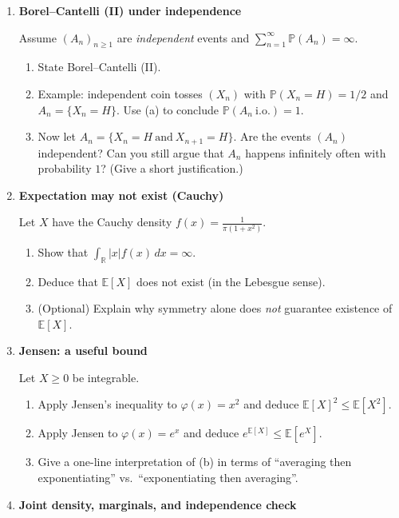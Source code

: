 \documentclass[11pt]{article}
\begin{document}
\begin{enumerate}[leftmargin=*, itemsep=1.2em]
\item \textbf{Borel--Cantelli (II) under independence}

Assume $(A_n)_{n\ge1}$ are \emph{independent} events and $\sum_{n=1}^\infty \mathbb{P}(A_n)=\infty$.
\begin{enumerate}[label=(\alph*)]
\item State Borel--Cantelli (II).
\item Example: independent coin tosses $(X_n)$ with $\mathbb{P}(X_n=H)=1/2$ and $A_n=\{X_n=H\}$.
Use (a) to conclude $\mathbb{P}(A_n\ \text{i.o.})=1$.
\item Now let $A_n=\{X_n=H \ \text{and}\ X_{n+1}=H\}$. Are the events $(A_n)$ independent?
Can you still argue that $A_n$ happens infinitely often with probability $1$? (Give a short justification.)
\end{enumerate}


\item \textbf{Expectation may not exist (Cauchy)}

Let $X$ have the Cauchy density $f(x)=\frac{1}{\pi(1+x^2)}$.
\begin{enumerate}[label=(\alph*)]
\item Show that $\int_{\mathbb{R}} |x| f(x)\,dx = \infty$.
\item Deduce that $\mathbb{E}[X]$ does not exist (in the Lebesgue sense).
\item (Optional) Explain why symmetry alone does \emph{not} guarantee existence of $\mathbb{E}[X]$.
\end{enumerate}

\item \textbf{Jensen: a useful bound}

Let $X\ge 0$ be integrable.
\begin{enumerate}[label=(\alph*)]
\item Apply Jensen's inequality to $\varphi(x)=x^2$ and deduce $\mathbb{E}[X]^2\le \mathbb{E}[X^2]$.
\item Apply Jensen to $\varphi(x)=e^x$ and deduce $e^{\mathbb{E}[X]}\le \mathbb{E}[e^X]$.
\item Give a one-line interpretation of (b) in terms of ``averaging then exponentiating'' vs.\ ``exponentiating then averaging''.
\end{enumerate}

\item \textbf{Joint density, marginals, and independence check}


\end{enumerate}
\end{document}
